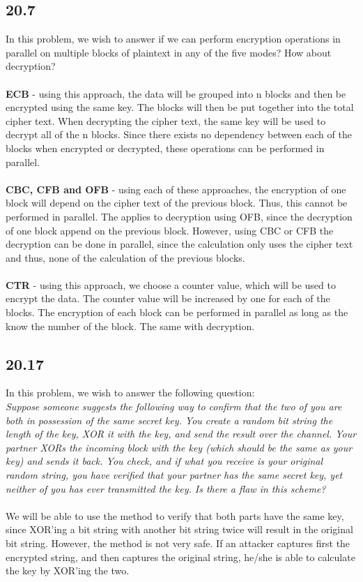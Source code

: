 \documentclass{article}
\begin{document}
\subsection{20.7}
In this problem, we wish to answer if we can perform encryption operations in parallel on multiple blocks of plaintext in any of the five modes? How about decryption?
\\
\\
\textbf{ECB} - using this approach, the data will be grouped into n blocks and then be encrypted using the same key. The blocks will then be put together into the total cipher text. When decrypting the cipher text, the same key will be used to decrypt all of the n blocks. Since there exists no dependency between each of the blocks when encrypted or decrypted, these operations can be performed in parallel.  
\\
\\
\textbf{CBC, CFB and OFB} - using each of these approaches, the encryption of one block will depend on the cipher text of the previous block. Thus, this cannot be performed in parallel. The applies to decryption using OFB, since the decryption of one block append on the previous block. However, using CBC or CFB the decryption can be done in parallel, since the calculation only uses the cipher text and thus, none of the calculation of the previous blocks. 
\\
\\
\textbf{CTR} - using this approach, we choose a counter value, which will be used to encrypt the data. The counter value will be increased by one for each of the blocks. The encryption of each block can be performed in parallel as long as the know the number of the block. The same with decryption. 



\subsection{20.17}
In this problem, we wish to answer the following question:\\

\textit{Suppose someone suggests the following way to confirm that the two of you are both in possession of the same secret key. You create a random bit string the length of the key, XOR it with the key, and send the result over the channel. Your partner XORs the incoming block with the key (which should be the same as your key) and sends it back. You check, and if what you receive is your original random string, you have  verified that your partner has the same secret key, yet neither of you has ever transmitted the key. Is there a flaw in this scheme?}
\\
\\ 
We will be able to use the method to verify that both parts have the same key, since XOR'ing a bit string with another bit string twice will result in the original bit string. However, the method is not very safe. If an attacker captures first the encrypted string, and then captures the original string, he/she is able to calculate the key by XOR'ing the two. 
\end{document}
